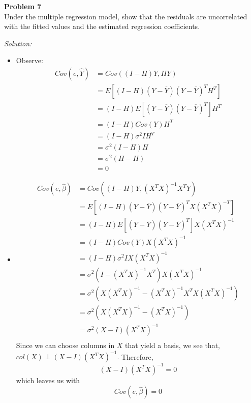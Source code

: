 \documentclass{article}
\newenvironment{problem}[2][Problem]
    { \begin{mdframed}[backgroundcolor=gray!20] \textbf{#1 #2} \\}
    {  \end{mdframed}}
\newenvironment{solution}
    {\textit{Solution:}}
    {}
\begin{document}
\begin{problem}{7}
Under the multiple regression model, show that the residuals are uncorrelated with the fitted values and the estimated regression coefficients.
\end{problem}
\begin{solution}
\begin{itemize}
\item Observe: 
\begin{align*}
Cov(e, \hat Y) &= Cov\left ( (I - H)Y, HY \right) \\
&= E \left [ (I - H)(Y - \overline{Y} )(Y - \overline{Y} )^T H^T \right] \\
&= (I - H) E \left [ (Y - \overline{Y} )(Y - \overline{Y} )^T\right]  H^T \\
&= (I - H) Cov(Y) H^T \\
&=(I - H) \sigma^2 I H^T\\
&=\sigma^2 (I - H) H \\
&= \sigma^2 (H - H) \\
&= 0
\end{align*}
\item 
\begin{align*}
Cov(e, \hat \beta) &= Cov\left ( (I - H)Y,  (X^T X)^{-1} X^T Y \right) \\
&= E \left [ (I - H)(Y - \overline{Y} )(Y - \overline{Y} )^T X (X^T X)^{-T}  \right] \\
&= (I - H) E \left [ (Y - \overline{Y} )(Y - \overline{Y} )^T\right]  X (X^T X)^{-1} \\
&= (I - H) Cov(Y)  X (X^T X)^{-1}  \\
&=(I - H) \sigma^2 I X (X^T X)^{-1}\\
&=\sigma^2 (I - (X^T X)^{-1} X^T) X (X^T X)^{-1} \\
&= \sigma^2 (X (X^T X)^{-1} - (X^T X)^{-1} X^T X (X^T X)^{-1}) \\
&= \sigma^2 (X (X^T X)^{-1} - (X^T X)^{-1} ) \\
&= \sigma^2 (X - I) (X^T X)^{-1} \\
\end{align*}
Since we can choose columns in $X$ that yield a basis, we see that, $col(X) \perp  (X - I) (X^T X)^{-1}.$ Therefore, 
$$ (X - I) (X^T X)^{-1} = 0$$
which leaves us with 
$$Cov(e, \hat \beta) = 0$$
\end{itemize}
\end{solution}
\end{document}
